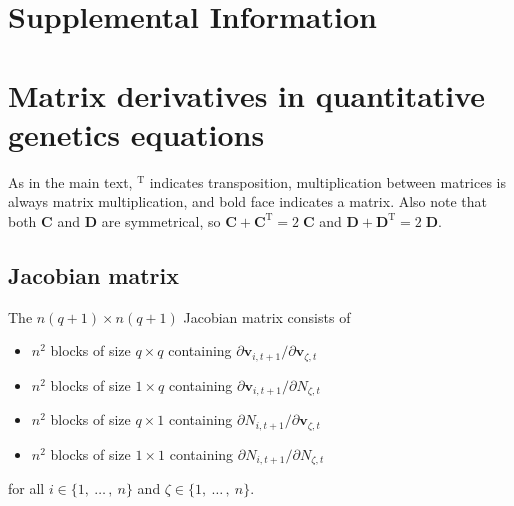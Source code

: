 

\section*{\huge{Supplemental Information}}



\renewcommand{\thefigure}{S\arabic{figure}}
\renewcommand{\theequation}{S\arabic{equation}}
\renewcommand{\thetable}{S\arabic{table}}
\setcounter{equation}{0}
\setcounter{figure}{0}
\setcounter{table}{0}




\section*{Matrix derivatives in quantitative genetics equations}

As in the main text, $^{\textrm{T}}$ indicates transposition,
multiplication between matrices is always matrix multiplication, and
bold face indicates a matrix.
Also note that both $\mathbf{C}$ and $\mathbf{D}$ are symmetrical,
so $\mathbf{C} + \mathbf{C}^{\textrm{T}} = 2 \; \mathbf{C}$ and
$\mathbf{D} + \mathbf{D}^{\textrm{T}} = 2 \; \mathbf{D}$.




\subsection*{Jacobian matrix}

The $n(q+1) \times n(q+1)$ Jacobian matrix consists of 

\begin{itemize}
\item $n^2$ blocks of size $q \times q$ containing
    $\partial \mathbf{v}_{i,t+1} / \partial \mathbf{v}_{\zeta,t}$
\item $n^2$ blocks of size $1 \times q$ containing
    $\partial \mathbf{v}_{i,t+1} / \partial N_{\zeta,t}$
\item $n^2$ blocks of size $q \times 1$ containing
    $\partial N_{i,t+1} / \partial \mathbf{v}_{\zeta,t}$
\item $n^2$ blocks of size $1 \times 1$ containing
    $\partial N_{i,t+1} / \partial N_{\zeta,t}$
\end{itemize}


for all $i \in \{ 1, \: \ldots \, , \: n \}$
and $\zeta \in \{ 1, \: \ldots \, , \: n \}$.


